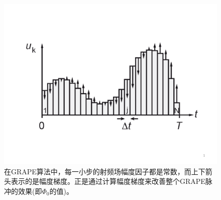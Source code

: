 \begin{figure}[htbp]
            \begin{center}
              \includegraphics[width= 0.8\columnwidth]{figures/grape.pdf}
              \caption{在GRAPE算法中，每一小步的射频场幅度因子都是常数，而上下箭头表示的是幅度梯度。正是通过计算幅度梯度来改善整个GRAPE脉冲的效果(即$\Phi_0$的值)。
              }
              \label{grape}
            \end{center}
\end{figure}

